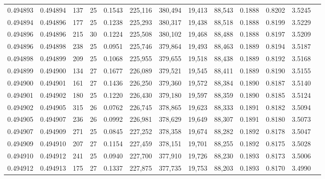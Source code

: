 \begin{tabular}{rrrrrrrrrrrrr}
0.494893 & 0.494894 & 137 &  25 &                                     0.1543 & 225,116 & 380,494 &  19,413 &  88,543 & 0.1888 & 0.8202 & 3.5245 \\
0.494894 & 0.494896 & 177 &  25 &                                     0.1238 & 225,293 & 380,317 &  19,438 &  88,518 & 0.1888 & 0.8199 & 3.5229 \\
0.494896 & 0.494896 & 215 &  30 &                                     0.1224 & 225,508 & 380,102 &  19,468 &  88,488 & 0.1888 & 0.8197 & 3.5209 \\
0.494896 & 0.494898 & 238 &  25 &                                     0.0951 & 225,746 & 379,864 &  19,493 &  88,463 & 0.1889 & 0.8194 & 3.5187 \\
0.494898 & 0.494899 & 209 &  25 &                                     0.1068 & 225,955 & 379,655 &  19,518 &  88,438 & 0.1889 & 0.8192 & 3.5168 \\
0.494899 & 0.494900 & 134 &  27 &                                     0.1677 & 226,089 & 379,521 &  19,545 &  88,411 & 0.1889 & 0.8190 & 3.5155 \\
0.494900 & 0.494901 & 161 &  27 &                                     0.1436 & 226,250 & 379,360 &  19,572 &  88,384 & 0.1890 & 0.8187 & 3.5140 \\
0.494901 & 0.494902 & 180 &  25 &                                     0.1220 & 226,430 & 379,180 &  19,597 &  88,359 & 0.1890 & 0.8185 & 3.5124 \\
0.494902 & 0.494905 & 315 &  26 &                                     0.0762 & 226,745 & 378,865 &  19,623 &  88,333 & 0.1891 & 0.8182 & 3.5094 \\
0.494905 & 0.494907 & 236 &  26 &                                     0.0992 & 226,981 & 378,629 &  19,649 &  88,307 & 0.1891 & 0.8180 & 3.5073 \\
0.494907 & 0.494909 & 271 &  25 &                                     0.0845 & 227,252 & 378,358 &  19,674 &  88,282 & 0.1892 & 0.8178 & 3.5047 \\
0.494909 & 0.494910 & 207 &  27 &                                     0.1154 & 227,459 & 378,151 &  19,701 &  88,255 & 0.1892 & 0.8175 & 3.5028 \\
0.494910 & 0.494912 & 241 &  25 &                                     0.0940 & 227,700 & 377,910 &  19,726 &  88,230 & 0.1893 & 0.8173 & 3.5006 \\
0.494912 & 0.494913 & 175 &  27 &                                     0.1337 & 227,875 & 377,735 &  19,753 &  88,203 & 0.1893 & 0.8170 & 3.4990 \\

\end{tabular}

